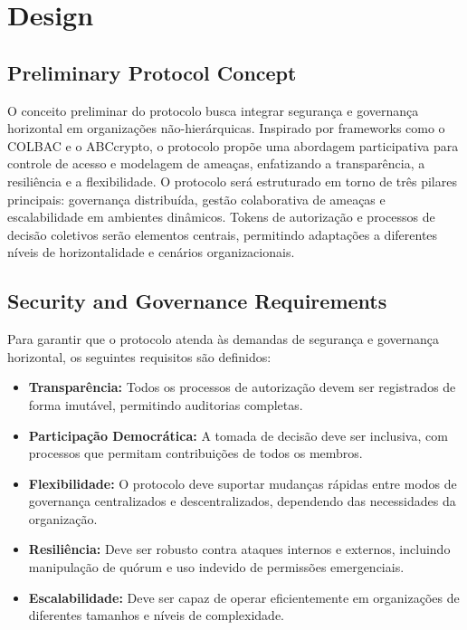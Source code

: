 
%

\chapter{Design}
\label{cha:design}

\glsresetall

\section{Preliminary Protocol Concept}
\label{sec:preliminary_protocol_concept}

O conceito preliminar do protocolo busca integrar segurança e
governança horizontal em organizações não-hierárquicas. Inspirado por
frameworks como o COLBAC e o ABCcrypto, o protocolo propõe uma
abordagem participativa para controle de acesso e modelagem de
ameaças, enfatizando a transparência, a resiliência e a flexibilidade.
O protocolo será estruturado em torno de três pilares principais:
governança distribuída, gestão colaborativa de ameaças e
escalabilidade em ambientes dinâmicos. Tokens de autorização e
processos de decisão coletivos serão elementos centrais, permitindo
adaptações a diferentes níveis de horizontalidade e cenários
organizacionais.

\section{Security and Governance Requirements}
\label{sec:security_governance_requirements}

Para garantir que o protocolo atenda às demandas de segurança e
governança horizontal, os seguintes requisitos são definidos:

\begin{itemize}
    \item \textbf{Transparência:} Todos os processos de autorização
devem ser registrados de forma imutável, permitindo auditorias
completas.
    \item \textbf{Participação Democrática:} A tomada de decisão deve
ser inclusiva, com processos que permitam contribuições de todos os
membros.
    \item \textbf{Flexibilidade:} O protocolo deve suportar mudanças
rápidas entre modos de governança centralizados e descentralizados,
dependendo das necessidades da organização.
    \item \textbf{Resiliência:} Deve ser robusto contra ataques
internos e externos, incluindo manipulação de quórum e uso indevido de
permissões emergenciais.
    \item \textbf{Escalabilidade:} Deve ser capaz de operar
eficientemente em organizações de diferentes tamanhos e níveis de
complexidade.
\end{itemize}

